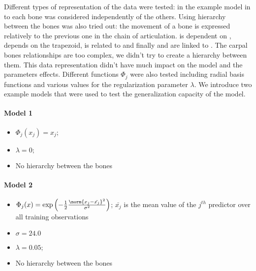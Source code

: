 Different types of representation of the data were tested: in the example model in  to  each bone was considered independently of the others. Using hierarchy between the bones was also tried out: the movement of a bone is expressed relatively to the previous one in the chain of articulation. \mcu* is dependent on \tpm*, \mcd* depends on the trapezoid, \mct* is related to \capitate* and finally \mcq* and \mcc* are linked to \ham*. The carpal bones relationships are too complex, we didn't try to create a hierarchy between them. This data representation didn't have much impact on the model and the parameters effects. Different functions $\Phi_j$ were also tested including radial basis functions and various values for the regularization parameter $\lambda$. We introduce two example models that were used to test the generalization capacity of the model. 

\paragraph{Model 1}
\label{model1}
\begin{itemize}
	\item $\Phi_j(x_j) = x_j$; 
	\item  $\lambda = 0;$ 
	\item No hierarchy between the bones
\end{itemize}

\paragraph{Model 2}
\label{model2}
\begin{itemize}
	\item $\Phi_j(x) = \exp\left(-\frac{1}{2} \frac{\norm{x_j - \bar{x_j}}^2}{\sigma^2} \right)$; $\bar{x_j}$ is the mean value of the $j^{th}$ predictor over all training observations
	\item $\sigma = 24.0$  
	\item  $\lambda = 0.05;$
	\item No hierarchy between the bones
\end{itemize}

